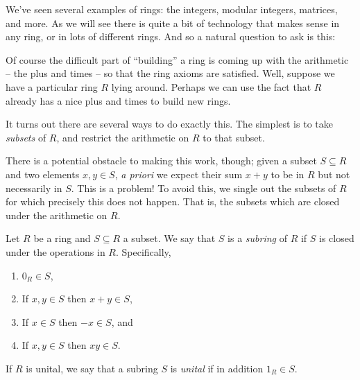 \documentclass{article}
\begin{document}

We've seen several examples of rings: the integers, modular integers, matrices, and more. As we will see there is quite a bit of technology that makes sense in any ring, or in lots of different rings. And so a natural question to ask is this:

\begin{center}
\end{center}

Of course the difficult part of ``building'' a ring is coming up with the arithmetic -- the plus and times -- so that the ring axioms are satisfied. Well, suppose we have a particular ring $R$ lying around. Perhaps we can use the fact that $R$ already has a nice plus and times to build new rings.

\begin{center}
\end{center}

It turns out there are several ways to do exactly this. The simplest is to take \emph{subsets} of $R$, and restrict the arithmetic on $R$ to that subset.

There is a potential obstacle to making this work, though; given a subset $S \subseteq R$ and two elements $x,y \in S$, \emph{a priori} we expect their sum $x+y$ to be in $R$ but not necessarily in $S$. This is a problem! To avoid this, we single out the subsets of $R$ for which precisely this does not happen. That is, the subsets which are closed under the arithmetic on $R$.

\begin{center}
\end{center}

\begin{dfn}[Subring]
Let $R$ be a ring and $S \subseteq R$ a subset. We say that $S$ is a \emph{subring} of $R$ if $S$ is closed under the operations in $R$. Specifically,
\begin{enumerate}
\item $0_R \in S$,
\item If $x,y \in S$ then $x+y \in S$,
\item If $x \in S$ then $-x \in S$, and
\item If $x,y \in S$ then $xy \in S$.
\end{enumerate}
If $R$ is unital, we say that a subring $S$ is \emph{unital} if in addition $1_R \in S$. 
\end{dfn}
\end{document}
